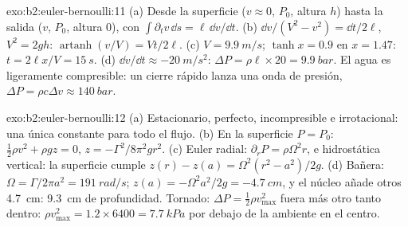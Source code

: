 \begin{solution}{exo:b2:euler-bernoulli:11}
(a) Desde la superficie ($v \approx 0$, $P_0$, altura $h$) hasta la salida ($v$, $P_0$,
altura $0$), con $\int\partial_tv\,\dd s = \ell\,\dd v/\dd t$. (b) $\dd v/(V^2 -
v^2) = \dd t/2\ell$, $V^2 = 2gh$: $\operatorname{artanh}(v/V) = Vt/2\ell$. (c) $V =
\qty{9.9}{m/s}$; $\tanh x = 0.9$ en $x = 1.47$: $t = 2\ell x/V = \qty{15}{s}$. (d)
$\dd v/\dd t \approx \qty{-20}{m/s^2}$: $\Delta P = \rho\ell \times 20 = \qty{9.9}{bar}$.
El agua es ligeramente compresible: un cierre rápido lanza una onda de
presión, $\Delta P = \rho c\Delta v \approx \qty{140}{bar}$.
\end{solution}

\begin{solution}{exo:b2:euler-bernoulli:12}
(a) Estacionario, perfecto, incompresible e irrotacional: una única
constante para todo el flujo. (b) En la superficie $P = P_0$: $\tfrac12\rho v^2 + \rho gz =
0$, $z = -\Gamma^2/8\pi^2gr^2$. (c) Euler radial: $\partial_rP = \rho\Omega^2r$,
e hidrostática vertical: la superficie cumple $z(r) - z(a) = \Omega^2(r^2 -
a^2)/2g$. (d) Bañera: $\Omega = \Gamma/2\pi a^2 = \qty{191}{rad/s}$; $z(a) = -\Omega^2a^2/
2g = \qty{-4.7}{cm}$, y el núcleo añade otros \qty{4.7}{cm}: \qty{9.3}{cm} de profundidad.
Tornado: $\Delta P = \tfrac12\rho v_{\max}^2$ fuera más otro tanto dentro:
$\rho v_{\max}^2 = 1.2 \times 6400 = \qty{7.7}{kPa}$ por debajo de la ambiente en el centro.
\end{solution}

